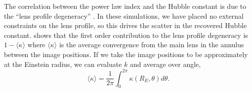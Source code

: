 The correlation between the power law index and the Hubble constant is due to the ``lens profile degeneracy'' \citep{Kochanek02}. In these simulations, we have placed no external constraints on the lens profile, so this drives the scatter in the recovered Hubble constant. \citet{Kochanek02} shows that the first order contribution to the lens profile degeneracy is $ 1 - \langle \kappa \rangle$ where $\langle \kappa \rangle$ is the average convergence from the main lens in the annulus between the image positions. If we take the image positions to be approximately at the Einstein radius, we can evaluate $k$ and average over angle,
\begin{equation}
\langle \kappa \rangle = \frac{1}{2 \pi} \int_{0}^{2 \pi} \kappa(R_E, \theta) d \theta.
\end{equation}